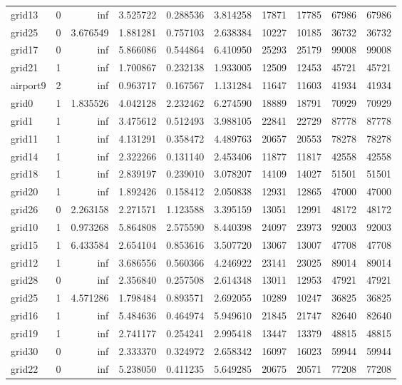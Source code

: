 \begin{longtable}{|l|r|r|r|r|r|r|r|r|r|}
grid13 & 0 & inf & 3.525722 & 0.288536 & 3.814258 & 17871 & 17785 & 67986 & 67986 \\
grid25 & 0 & 3.676549 & 1.881281 & 0.757103 & 2.638384 & 10227 & 10185 & 36732 & 36732 \\
grid17 & 0 & inf & 5.866086 & 0.544864 & 6.410950 & 25293 & 25179 & 99008 & 99008 \\
grid21 & 1 & inf & 1.700867 & 0.232138 & 1.933005 & 12509 & 12453 & 45721 & 45721 \\
airport9 & 2 & inf & 0.963717 & 0.167567 & 1.131284 & 11647 & 11603 & 41934 & 41934 \\
grid0 & 1 & 1.835526 & 4.042128 & 2.232462 & 6.274590 & 18889 & 18791 & 70929 & 70929 \\
grid1 & 1 & inf & 3.475612 & 0.512493 & 3.988105 & 22841 & 22729 & 87778 & 87778 \\
grid11 & 1 & inf & 4.131291 & 0.358472 & 4.489763 & 20657 & 20553 & 78278 & 78278 \\
grid14 & 1 & inf & 2.322266 & 0.131140 & 2.453406 & 11877 & 11817 & 42558 & 42558 \\
grid18 & 1 & inf & 2.839197 & 0.239010 & 3.078207 & 14109 & 14027 & 51501 & 51501 \\
grid20 & 1 & inf & 1.892426 & 0.158412 & 2.050838 & 12931 & 12865 & 47000 & 47000 \\
grid26 & 0 & 2.263158 & 2.271571 & 1.123588 & 3.395159 & 13051 & 12991 & 48172 & 48172 \\
grid10 & 1 & 0.973268 & 5.864808 & 2.575590 & 8.440398 & 24097 & 23973 & 92003 & 92003 \\
grid15 & 1 & 6.433584 & 2.654104 & 0.853616 & 3.507720 & 13067 & 13007 & 47708 & 47708 \\
grid12 & 1 & inf & 3.686556 & 0.560366 & 4.246922 & 23141 & 23025 & 89014 & 89014 \\
grid28 & 0 & inf & 2.356840 & 0.257508 & 2.614348 & 13011 & 12953 & 47921 & 47921 \\
grid25 & 1 & 4.571286 & 1.798484 & 0.893571 & 2.692055 & 10289 & 10247 & 36825 & 36825 \\
grid16 & 1 & inf & 5.484636 & 0.464974 & 5.949610 & 21845 & 21747 & 82640 & 82640 \\
grid19 & 1 & inf & 2.741177 & 0.254241 & 2.995418 & 13447 & 13379 & 48815 & 48815 \\
grid30 & 0 & inf & 2.333370 & 0.324972 & 2.658342 & 16097 & 16023 & 59944 & 59944 \\
grid22 & 0 & inf & 5.238050 & 0.411235 & 5.649285 & 20675 & 20571 & 77208 & 77208 \\

\end{longtable}
